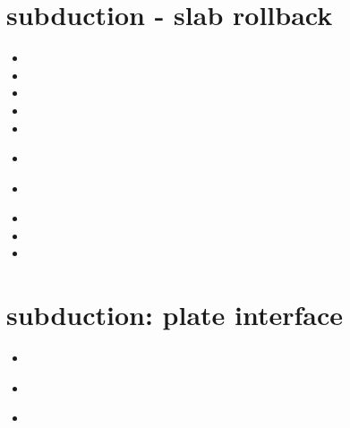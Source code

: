 \section{subduction - slab rollback} 

\begin{small}
\begin{itemize}
\item[\twothousandthree] 
\item[\twothousandsix] 
\item[\twothousandnine] 
\item[\twothousandnine] 
\item[\twothousandtwelve] 
\item[\twothousandthirteen] 
 \\
\item[\twothousandfourteen]
 \\
\item[\twothousandfifteen]
\item[2019]
\item[\twothousandtwenty]
\end{itemize}
\end{small}





\section{subduction: plate interface} 

\begin{small}
\begin{itemize}
\item[2021]
\item[2025]
 \\
\item[2026]
 \\
\end{itemize}
\end{small}


